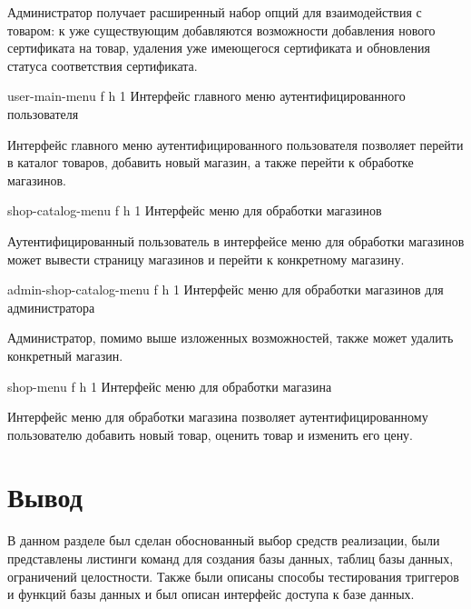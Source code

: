 Администратор получает расширенный набор опций для взаимодействия с товаром: к уже существующим добавляются возможности добавления нового сертификата на товар, удаления уже имеющегося сертификата и обновления статуса соответствия сертификата.

{user-main-menu} %
{f} %
{h} %
{1\textwidth} %
{Интерфейс главного меню аутентифицированного пользователя} %

\clearpage 

Интерфейс главного меню аутентифицированного пользователя позволяет перейти в каталог товаров, добавить новый магазин, а также перейти к обработке магазинов.

{shop-catalog-menu} %
{f} %
{h} %
{1\textwidth} %
{Интерфейс меню для обработки магазинов} %

Аутентифицированный пользователь в интерфейсе меню для обработки магазинов может вывести страницу магазинов и перейти к конкретному магазину.

{admin-shop-catalog-menu} %
{f} %
{h} %
{1\textwidth} %
{Интерфейс меню для обработки магазинов для администратора} %

Администратор, помимо выше изложенных возможностей, также может удалить конкретный магазин.

\clearpage

{shop-menu} %
{f} %
{h} %
{1\textwidth} %
{Интерфейс меню для обработки магазина} %

Интерфейс меню для обработки магазина позволяет аутентифицированному пользователю добавить новый товар,  оценить товар и изменить его цену.


\section*{Вывод}

В данном разделе был сделан обоснованный выбор средств реализации, были представлены листинги команд для создания базы данных, таблиц базы данных, ограничений целостности. Также были описаны способы тестирования триггеров и функций базы данных и был описан интерфейс доступа к базе данных.
